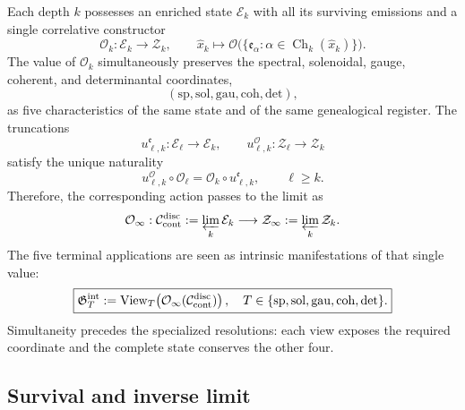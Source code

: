 {Each depth \(k\) possesses an enriched state \(\mathcal E_k\) with
all its surviving emissions and a single correlative constructor
\begin{equation}
\mathcal O_k:\mathcal E_k\longrightarrow\mathcal Z_k,
\qquad
\widehat x_k\longmapsto
\mathcal O\bigl(\{\mathfrak e_\alpha:
\alpha\in\operatorname{Ch}_k(\widehat x_k)\}\bigr).
\label{p12-83-c3-s1:eq:five-features-single-constructor}
\end{equation}
The value of \(\mathcal O_k\) simultaneously preserves the spectral,
solenoidal, gauge, coherent, and determinantal coordinates,
\begin{equation}
(\mathrm{sp},\mathrm{sol},\mathrm{gau},\mathrm{coh},\mathrm{det}),
\label{p12-83-c3-s1:eq:five-features-coordinates}
\end{equation}
as five characteristics of the same state and of the same genealogical register. The
truncations
\[
u^{\mathfrak e}_{\ell,k}:\mathcal E_\ell\to\mathcal E_k,
\qquad
u^{\mathcal O}_{\ell,k}:\mathcal Z_\ell\to\mathcal Z_k
\]
satisfy the unique naturality
\begin{equation}
u^{\mathcal O}_{\ell,k}\circ\mathcal O_\ell
=\mathcal O_k\circ u^{\mathfrak e}_{\ell,k},
\qquad \ell\ge k.
\label{p12-83-c3-s1:eq:five-features-naturality}
\end{equation}
Therefore, the corresponding action passes to the limit as
\begin{equation}
\mathcal O_\infty:
\mathcal C_{\rm cont}^{\rm disc}:=\varprojlim_k\mathcal E_k
\longrightarrow
\mathcal Z_\infty:=\varprojlim_k\mathcal Z_k.
\label{p12-83-c3-s1:eq:five-features-infinite-operator}
\end{equation}
The five terminal applications are seen as intrinsic manifestations of that single value:
\begin{equation}
\boxed{
\mathfrak G_T^{\rm int}:=
\operatorname{View}_T\!\left(
\mathcal O_\infty(\mathcal C_{\rm cont}^{\rm disc})\right),
\quad
T\in\{\mathrm{sp},\mathrm{sol},\mathrm{gau},
\mathrm{coh},\mathrm{det}\}.}
\label{p12-83-c3-s1:eq:five-features-views}
\end{equation}
Simultaneity precedes the specialized resolutions: each view exposes
the required coordinate and the complete state conserves the other four.

\subsection{Survival and inverse limit}

}
